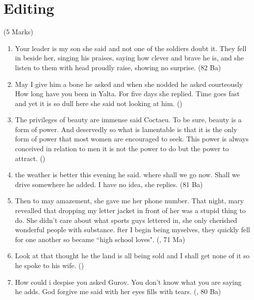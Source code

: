 \documentclass[12pt]{article}
\begin{document}
\section{Editing}
  \begin{center}(5 Marks)\end{center}
    \begin{enumerate}
      \item Your leader is my son she said and not one of the soldiers doubt it. They fell in beside her, singing his praises, saying how clever and brave he is, and she listen to them with head proudly raise, showing no surprise. \hfill  (82 Ba)

      \item May I give him a bone he asked and when she nodded he asked courteously How long have you been in Yalta. For five days she replied. Time goes fast and yet it is so dull here she said not looking at him. \hfill ()

      \item The privileges of beauty are immense said Coctaeu. To be sure, beauty is a form of power. And deservedly so what is lamentable is that it is the only form of power that most women are encouraged to seek. This power is always conceived in relation to men it is not the power to do but the power to attract. \hfill ()

      \item the weather is better this evening he said. where shall we go now. Shall we drive somewhere he added. I have no idea, she replies. \hfill (81 Ba)

      \item Then to may amazement, she gave me her phone number. That night, mary revealled that dropping my letter jacket in front of her was a stupid thing to do. She didn't care about what sports guys lettered in, she only cherished wonderful people with substance. fter I begin being myselves, they quickly fell for one another so became ``high school loves". \hfill (, 71 Ma)

      \item Look at that thought he the land is all being sold and I shall get none of it so he spoke to his wife. \hfill ()

      \item How could i despise you asked Gurov. You don't know what you are saying he adds. God forgive me said with her eyes fills with tears. \hfill (, 80 Ba)
        

\end{enumerate}
\end{document}
